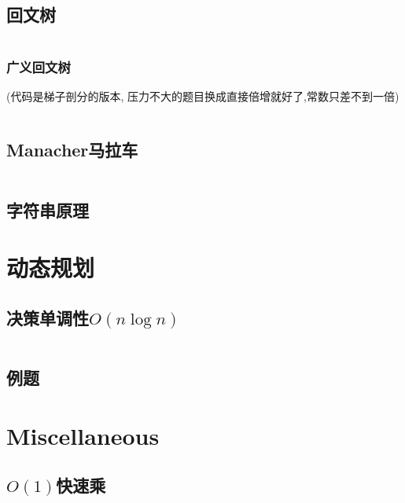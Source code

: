 \documentclass[a4paper]{article}
\begin{document}
\begin{multicols}{2}
			\subsection{回文树}
				\inputminted{cpp}{../src/string/回文树.cpp}

				\subsubsection{广义回文树}
					(代码是梯子剖分的版本, 压力不大的题目换成直接倍增就好了,常数只差不到一倍)
					\inputminted{cpp}{../src/string/广义回文树.cpp}



			\subsection{Manacher马拉车}
				\inputminted{cpp}{../src/string/manacher.cpp}
			


			\subsection{字符串原理}
				

			\section{动态规划}
				\subsection{决策单调性$O(n\log n)$}
					\inputminted{cpp}{../src/DP/决策单调性.cpp}
				
				\subsection{例题}

				
			\section{Miscellaneous}
				\subsection{$O(1)$快速乘}
					\inputminted{cpp}{../src/misc/O(1)快速乘.cpp}
				

\end{multicols}
\end{document}
